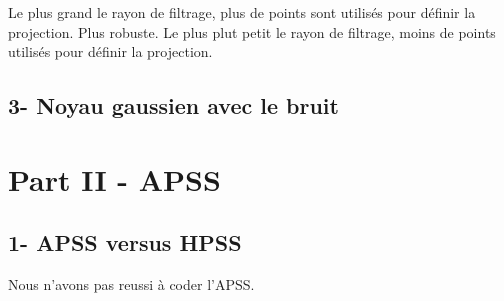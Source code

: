 \documentclass[a4,12pt]{report}
\begin{document}
Le plus grand le rayon de filtrage, plus de points sont utilisés pour définir la projection. Plus robuste.
Le plus plut petit le rayon de filtrage, moins de points utilisés pour définir la projection. 


\subsection*{3- Noyau gaussien avec le bruit}


\section*{Part II - APSS}
\subsection*{1- APSS versus HPSS} 
Nous n'avons pas reussi à coder l'APSS.

\end{document}
